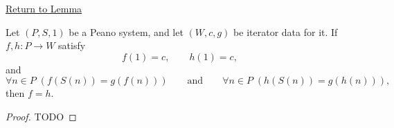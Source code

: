 \newpage
{}
\label{prf:uniqueness-of-iterator-functions}

\begin{remark*}[Return]
\hyperref[lem:uniqueness-of-iterator-functions]{Return to Lemma}
\end{remark*}

\begin{theorem*}
Let $(P,S,1)$ be a Peano system, and let $(W,c,g)$ be iterator data for it. If
$f,h:P\to W$ satisfy
\[
f(1)=c,\qquad h(1)=c,
\]
and
\[
\forall n\in P\;(f(S(n))=g(f(n)))
\qquad\text{and}\qquad
\forall n\in P\;(h(S(n))=g(h(n))),
\]
then $f=h$.
\end{theorem*}

\begin{proof}
TODO
\end{proof}
